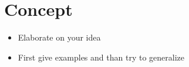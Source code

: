
\section{Concept}
\label{sec:concept}
\begin{itemize}
	\item Elaborate on your idea
	\item First give examples and than try to generalize
\end{itemize}